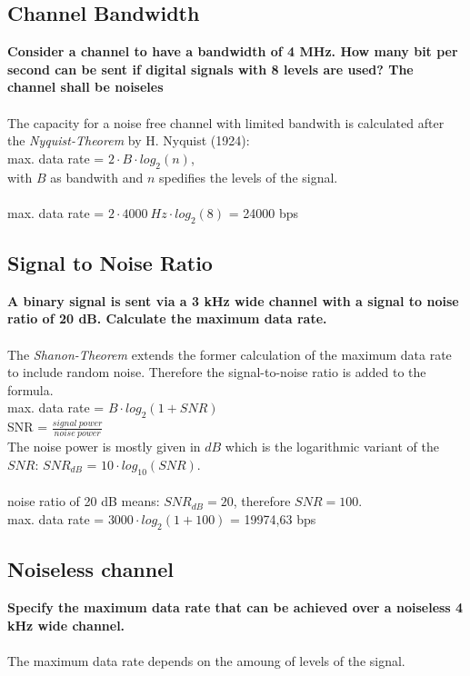 \documentclass[a4paper,12pt]{article}
\begin{document}
	
\subsection{Channel Bandwidth}
\textbf{Consider a channel to have a bandwidth of 4 MHz. How many bit per second can be sent if digital signals with 8 levels are used? The channel shall be noiseles}\\
\\
The capacity for a noise free channel with limited bandwith is calculated after the \textit{Nyquist-Theorem} by H. Nyquist (1924):\\
max. data rate = $2 \cdot B \cdot log_{2}(n)$,\\
with $B$ as bandwith and $n$ spedifies the levels of the signal.
\\
\\
max. data rate = $2 \cdot 4000~Hz \cdot log_{2}(8)$ = 24000 bps
	
\subsection{Signal to Noise Ratio}
\textbf{A binary signal is sent via a 3 kHz wide channel with a signal to noise ratio of 20 dB. Calculate the maximum data rate.}\\
\\
The \textit{Shanon-Theorem} extends the former calculation of the maximum data rate to include random noise. Therefore the signal-to-noise ratio is added to the formula.\\
max. data rate = $B \cdot log_{2}(1 + SNR)$\\
SNR = $\frac{signal~power}{noise~power}$\\
The noise power is mostly given in $dB$ which is the logarithmic variant of the $SNR$: $SNR_{dB}$ = $10 \cdot log_{10}(SNR)$.\\
\\
noise ratio of 20 dB means: $SNR_{dB} = 20$, therefore $SNR = 100$.\\
max. data rate = $3000 \cdot log_{2}(1 +100)$ = 19974,63 bps\\

\subsection{Noiseless channel}
\textbf{Specify the maximum data rate that can be achieved over a noiseless 4 kHz wide channel.}\\
\\
The maximum data rate depends on the amoung of levels of the signal. \\
\end{document}

